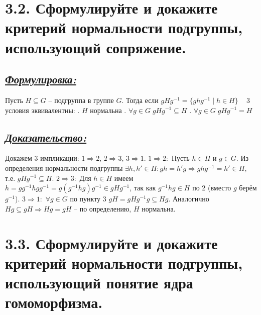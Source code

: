 \documentclass{article}
\begin{document}
\section*{\LARGE 3.2. Сформулируйте и докажите критерий нормальности подгруппы, использующий сопряжение. }
\subsection*{\Large \underline{\textit{Формулировка: }}}
Пусть $H \subseteq G$ -- подгруппа в группе $G$. Тогда если $gHg^{-1} = \{ghg^{-1}\;|\;h\in H\}\;\;\;$ 3 условия эквивалентны:
\newline {}. $H$ нормальна
\newline {}. $\forall g \in G \; gHg^{-1} \subseteq H $
\newline {}. $\forall g \in G \; gHg^{-1} = H $

\subsection*{\Large \underline{\textit{Доказательство: }}}
Докажем 3 импликации: $1 \Rightarrow 2, \, 2 \Rightarrow 3, \, 3 \Rightarrow 1$.
\newline \indent \underline{$1 \Rightarrow 2:$}
\newline Пусть $h \in H$ и $g \in G$. Из определения нормальности подгруппы 
\newline $\exists h, h' \in H : gh = h'g \Rightarrow ghg^{-1} = h' \in H$, т.е. $gHg^{-1} \subseteq H$. 
\newline \indent \underline{$2 \Rightarrow 3:$}
\newline Для $h \in H$ имеем $h = gg^{-1}hgg^{-1} = g(g^{-1}hg)g^{-1} \in gHg^{-1}$, так как $g^{-1}hg \in H$ по 2 (вместо $g$ берём $g^{-1}$).
\newline \indent \underline{$3 \Rightarrow 1:$}
\newline $\forall g \in G$ по пункту 3 $gH = gHg^{-1}g \subseteq Hg$. Аналогично $Hg \subseteq gH \Rightarrow Hg = gH$ -- по определению, $H$ нормальна.

\section*{\LARGE 3.3. Сформулируйте и докажите критерий нормальности подгруппы, использующий понятие ядра гомоморфизма. }
\end{document}
